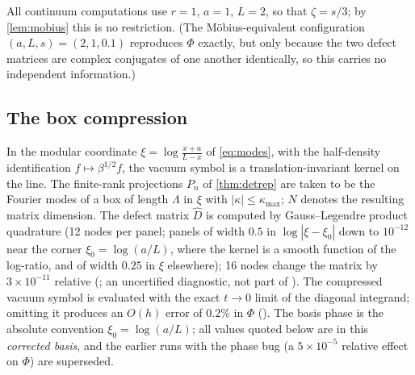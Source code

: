 \label{sec:numerics}
All continuum computations use $r=1$, $a=1$, $L=2$, so that $\zeta=s/3$; by
\cref{lem:mobius} this is no restriction.  (The M\"obius-equivalent configuration
$(a,L,s)=(2,1,0.1)$ reproduces $\Phi$ exactly, but only because the two defect
matrices are complex conjugates of one another identically, so this carries no
independent information.)

\subsection{The box compression}
In the modular coordinate $\xi=\log\frac{x+a}{L-x}$ of \eqref{eq:modes}, with the
half-density identification $f\mapsto\beta^{1/2}f$, the vacuum symbol is a
translation-invariant kernel on the line.  The finite-rank projections $P_n$ of
\cref{thm:detrep} are taken to be the Fourier modes of a box of length $\Lambda$
in $\xi$ with $|\kappa|\le\kappa_{\max}$; $N$ denotes the resulting matrix
dimension.  The defect matrix $\widehat D$ is computed by Gauss--Legendre product
quadrature (12 nodes per panel; panels of width $0.5$ in $\log|\xi-\xi_0|$ down to
$10^{-12}$ near the corner $\xi_0=\log(a/L)$, where the kernel is a smooth
function of the log-ratio, and of width $0.25$ in $\xi$ elsewhere); 16 nodes
change the matrix by $3\times10^{-11}$ relative (\cite[\S6]{Note5}; an uncertified diagnostic, not part of \cite{RigorCN}).  The compressed vacuum symbol is
evaluated with the exact $t\to0$ limit of the diagonal integrand; omitting it
produces an $O(h)$ error of $0.2\%$ in $\Phi$ (\cite[\S6]{Note5}).  The basis phase is the absolute
convention $\xi_0=\log(a/L)$; all values quoted below are in this
\emph{corrected basis}, and the earlier runs with the phase bug (a $5\times10^{-5}$
relative effect on $\Phi$) are superseded.


